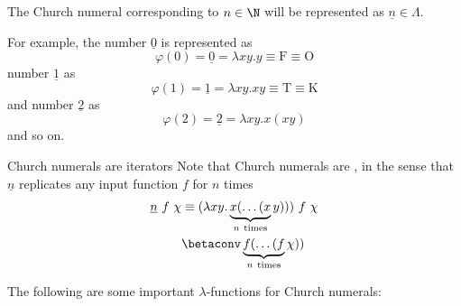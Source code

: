 \documentclass[a4paper, 12pt]{report}
\begin{document}
    The Church numeral corresponding to $n \in \N$ will be represented as $\underline n \in \Lambda$.

    \begin{example}
        For example, the number $\underline 0$ is represented as $$\varphi(0) = \underline 0 = \lambda xy. y \equiv \mathrm F \equiv \mathrm O$$ number $\underline 1$ as $$\varphi(1) = \underline 1 = \lambda xy.xy \equiv \mathrm T \equiv \mathrm K$$ and number $\underline 2$ as $$\varphi(2) = \underline 2 = \lambda xy.x(xy)$$ and so on.
    \end{example}

    \begin{framedobs}[label={church_iterators}]{Church numerals are iterators}
        Note that Church numerals are , in the sense that $\underline n$ replicates any input function $f$ for $n$ times
        \begin{equation*}
            \begin{split}
                \underline n \ f \ \chi &\equiv (\lambda xy.\underbrace{x(\ldots(x}_{n \ \mathrm{times}}y))) \ f \ \chi \\
                                        &\betaconv \underbrace{f(\ldots(f}_{n \ \mathrm{times}}\chi))
            \end{split}
        \end{equation*}
    \end{framedobs}

    The following are some important $\lambda$-functions for Church numerals:
    
\end{document}
